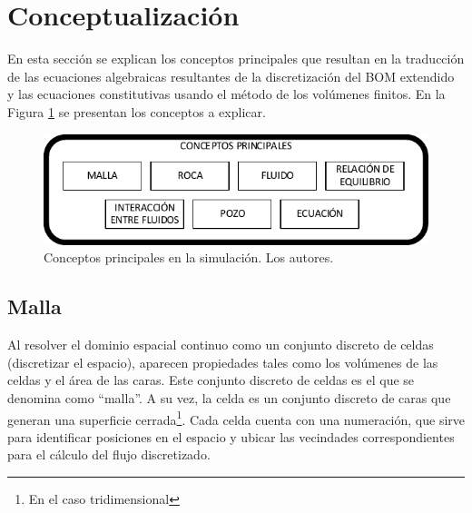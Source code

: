 \section{Conceptualización}\label{sec:Concepts}
En esta sección se explican los conceptos principales que resultan en la traducción de las ecuaciones algebraicas resultantes de la discretización del BOM extendido y las ecuaciones constitutivas usando el método de los volúmenes finitos. En la Figura \ref{fig:Concepts} se presentan los conceptos a explicar.

\begin{figure}[h]
	\centering%
	\includegraphics[width=0.9\linewidth]{Fig/Conceptos.pdf}%
	\caption[Conceptos principales en la simulación.]{Conceptos principales en la simulación. Los autores.} \label{fig:Concepts}
\end{figure}

\subsection{Malla}\label{subsec:PS_Mesh}
Al resolver el dominio espacial continuo como un conjunto discreto de celdas (discretizar el espacio), aparecen propiedades tales como los volúmenes de las celdas y el área de las caras. Este conjunto discreto de celdas es el que se denomina como ``malla''. A su vez, la celda es un conjunto discreto de caras que generan una superficie cerrada\footnote{En el caso tridimensional}. Cada celda cuenta con una numeración, que sirve para identificar posiciones en el espacio y ubicar las vecindades correspondientes para el cálculo del flujo discretizado.\\

